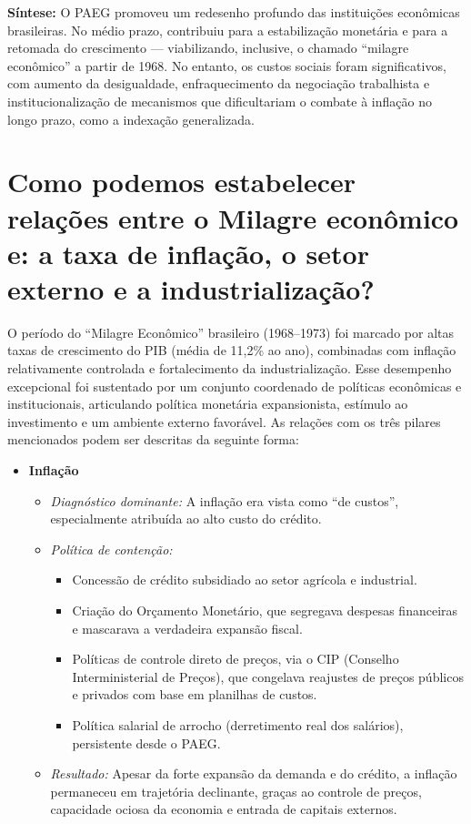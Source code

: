 \documentclass{sciposter}
\begin{document}
\begin{multicols}{3}
\textbf{Síntese:} O PAEG promoveu um redesenho profundo das instituições econômicas brasileiras. No médio prazo, contribuiu para a estabilização monetária e para a retomada do crescimento — viabilizando, inclusive, o chamado “milagre econômico” a partir de 1968. No entanto, os custos sociais foram significativos, com aumento da desigualdade, enfraquecimento da negociação trabalhista e institucionalização de mecanismos que dificultariam o combate à inflação no longo prazo, como a indexação generalizada.

\section{\textbf{Como podemos estabelecer relações entre o Milagre econômico e: a taxa de inflação, o setor externo e a industrialização?}}

O período do “Milagre Econômico” brasileiro (1968–1973) foi marcado por altas taxas de crescimento do PIB (média de 11,2\% ao ano), combinadas com inflação relativamente controlada e fortalecimento da industrialização. Esse desempenho excepcional foi sustentado por um conjunto coordenado de políticas econômicas e institucionais, articulando política monetária expansionista, estímulo ao investimento e um ambiente externo favorável. As relações com os três pilares mencionados podem ser descritas da seguinte forma:

\begin{itemize}
    \item \textbf{ Inflação}
    \begin{itemize}
        \item \textit{Diagnóstico dominante:} A inflação era vista como “de custos”, especialmente atribuída ao alto custo do crédito.
        \item \textit{Política de contenção:}
        \begin{itemize}
            \item Concessão de crédito subsidiado ao setor agrícola e industrial.
            \item Criação do Orçamento Monetário, que segregava despesas financeiras e mascarava a verdadeira expansão fiscal.
            \item Políticas de controle direto de preços, via o CIP (Conselho Interministerial de Preços), que congelava reajustes de preços públicos e privados com base em planilhas de custos.
            \item Política salarial de arrocho (derretimento real dos salários), persistente desde o PAEG.
        \end{itemize}
        \item \textit{Resultado:} Apesar da forte expansão da demanda e do crédito, a inflação permaneceu em trajetória declinante, graças ao controle de preços, capacidade ociosa da economia e entrada de capitais externos.
    \end{itemize}


\end{itemize}
\end{multicols}
\end{document}
